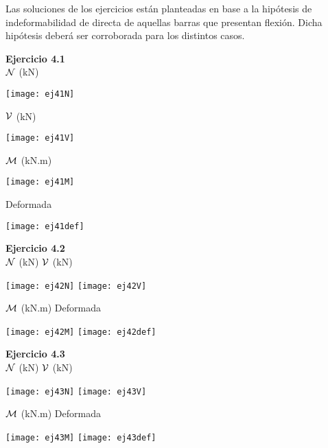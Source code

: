 Las soluciones de los ejercicios están planteadas en base a la hipótesis de indeformabilidad de directa de aquellas barras que presentan flexión. Dicha hipótesis deberá ser corroborada para los distintos casos.

\textbf{Ejercicio 4.1}\\

${\mathcal N}$ (kN)
\begin{center}
	\texttt{[image: ej41N]}
\end{center}


${\mathcal V}$ (kN)
\begin{center}
	\texttt{[image: ej41V]}
\end{center}


${\mathcal M}$ (kN.m)
\begin{center}
	\texttt{[image: ej41M]}
\end{center}


Deformada
\begin{center}
	\texttt{[image: ej41def]}
\end{center}


\clearpage
\textbf{Ejercicio 4.2}\\

\qquad \qquad
${\mathcal N}$ (kN) \hspace{0.5\textwidth} ${\mathcal V}$ (kN)
\begin{center}
	\texttt{[image: ej42N]}
	\texttt{[image: ej42V]}
\end{center}

\qquad \qquad
${\mathcal M}$ (kN.m)  \hspace{0.5\textwidth} Deformada
\begin{center}
	\texttt{[image: ej42M]}
	\texttt{[image: ej42def]}
\end{center}


\textbf{Ejercicio 4.3}\\

${\mathcal N}$ (kN) \hspace{0.4\textwidth} ${\mathcal V}$ (kN)
\begin{center}
	\texttt{[image: ej43N]}
	\texttt{[image: ej43V]}
\end{center}

${\mathcal M}$ (kN.m) \hspace{0.4\textwidth} Deformada
\begin{center}
	\texttt{[image: ej43M]}
	\texttt{[image: ej43def]}
\end{center}


